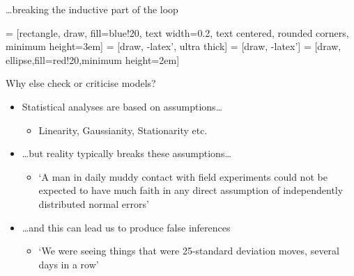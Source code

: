 \begin{frame}{\dots breaking the inductive part of the loop}
  \begin{center}
   = [rectangle, draw, fill=blue!20, 
                       text width=0.2\textwidth, text centered, rounded corners, minimum height=3em]
   = [draw, -latex', ultra thick]
   = [draw, -latex']
   = [draw, ellipse,fill=red!20,minimum height=2em]
    
  \end{center}
\end{frame}

\begin{frame}{Why else check or criticise models?}
  \begin{itemize}
    \item Statistical analyses are based on assumptions\dots
    \begin{itemize}
       \item \eg Linearity, Gaussianity, Stationarity etc.
     \end{itemize}
    \vspace{\baselineskip}
    \pause
    \item \dots but reality typically breaks these assumptions\dots
    \begin{itemize}
       \item `A man in daily muddy contact with field experiments could not be expected to have much faith in any direct assumption of independently distributed normal errors' \cite{Box1976-yg}
     \end{itemize}
    \vspace{\baselineskip}
    \pause
    \item \dots and this can lead us to produce false inferences
    \begin{itemize}
       \item `We were seeing things that were 25-standard deviation moves, several 
days in a row'
     \end{itemize}
  \end{itemize}
\end{frame}

